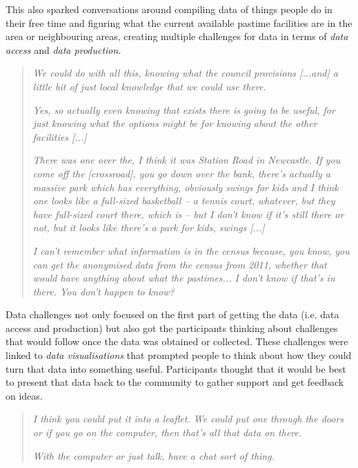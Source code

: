 This also sparked conversations around compiling data of things people do in their free time and figuring what the current available pastime facilities are in the area or neighbouring areas, creating multiple challenges for data in terms of \textit{data access} and \textit{data production}. 
\begin{quote}
    \textit{We could do with all this, knowing what the council provisions [...and] a little bit of just local knowledge that we could use there.}
    
   \textit{Yes, so actually even knowing that exists there is going to be useful, for just knowing what the options might be for knowing about the other facilities [...]}

    \textit{There was one over the, I think it was Station Road in Newcastle. If you come off the [crossroad], you go down over the bank, there's actually a massive park which has everything, obviously swings for kids and I think one looks like a full-sized basketball -- a tennis court, whatever, but they have full-sized court there, which is -- but I don't know if it's still there or not, but it looks like there's a park for kids, swings [...]}
    
    \textit{I can't remember what information is in the census because, you know, you can get the anonymised data from the census from 2011, whether that would have anything about what the pastimes... I don't know if that's in there. You don't happen to know?}
\end{quote}

Data challenges not only focused on the first part of getting the data (i.e. data access and production) but also got the participants thinking about challenges that would follow once the data was obtained or collected. These challenges were linked to \textit{data visualisations} that prompted people to think about how they could turn that data into something useful. Participants thought that it would be best to present that data back to the community to gather support and get feedback on ideas. 
\begin{quote}
    \textit{I think you could put it into a leaflet. We could put one through the doors or if you go on the computer, then that's all that data on there.}
    
    \textit{With the computer or just talk, have a chat sort of thing.}
\end{quote}

